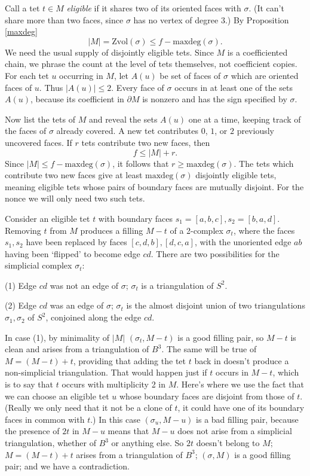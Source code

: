 \documentclass[12pt]{article}
\newcommand{\kw}{\mathrm}
\newcommand{\maxdeg}{\kw{maxdeg}}
\newcommand{\Zvol}{\kw{Zvol}}
\begin{document}
Call a tet $t \in M$ \emph{eligible} if it shares two of its oriented faces
with $\sigma$. (It can't share more than two faces,
since $\sigma$ has no vertex of
degree $3$.)
By Proposition \ref{maxdeg}
\[
|M| = \Zvol(\sigma) \leq f-\maxdeg(\sigma) .
\]
We need the usual supply of disjointly eligible tets.  Since $M$ is a
coefficiented chain, we phrase the count at the level of tets themselves,
not coefficient copies.  For each tet $u$ occurring in $M$, let $A(u)$ be
set of faces of $\sigma$ which are oriented faces of $u$.  Thus
$|A(u)|\leq 2$.  Every face of $\sigma$ occurs in at least one of the sets
$A(u)$, because its coefficient in $\partial M$ is nonzero and has the sign
specified by $\sigma$.

Now list the tets of $M$ and reveal the sets $A(u)$ one at a time, keeping
track of the faces of $\sigma$ already covered.  A new tet contributes
$0$, $1$, or $2$ previously uncovered faces.  If $r$ tets contribute two
new faces, then
\[
f \leq |M|+r.
\]
Since $|M|\leq f-\maxdeg(\sigma)$, it follows that
$r\geq \maxdeg(\sigma)$.  The tets which contribute two new faces give at
least $\maxdeg(\sigma)$ disjointly eligible tets, meaning eligible tets
whose pairs of boundary faces are mutually disjoint.  For the nonce we will
only need two such tets.

Consider an eligible tet $t$ with boundary faces
$s_1=[a,b,c],s_2=[b,a,d]$.
Removing $t$ from $M$ produces a filling $M-t$
of a 2-complex $\sigma_t$, where the faces $s_1,s_2$ have been replaced
by faces $[c,d,b],[d,c,a]$,
with the unoriented edge $ab$ having been `flipped' to become edge $cd$.
There are two possibilities for the simplicial complex $\sigma_t$:

(1) Edge $cd$ was not an edge of $\sigma$;
$\sigma_t$ is a triangulation of $S^2$.

(2) Edge $cd$ was an edge of $\sigma$;
$\sigma_t$ is the almost disjoint union of two triangulations
$\sigma_1,\sigma_2$ of $S^2$, conjoined along the edge $cd$.

In case (1), by minimality of $|M|$
$(\sigma_t,M-t)$ is a good filling pair,
so $M-t$ is clean and arises from a triangulation of $B^3$.
The same will be true of $M = (M-t) + t$,
providing that adding the tet $t$ back in
doesn't produce a non-simplicial triangulation.
That would happen just if $t$ occurs in $M-t$, which is to say that
$t$ occurs with multiplicity 2 in $M$.
Here's where we use the fact that we can choose an eligible tet $u$
whose boundary faces are disjoint from those of $t$.
(Really we only need that it not be a clone of $t$, it could have
one of its boundary faces in common with $t$.)
In this case $(\sigma_u, M-u)$ is a bad filling pair,
because the presence of $2t$ in $M-u$ means that $M-u$ does not
arise from a simplicial triangulation, whether of $B^3$ or anything else.
So $2t$ doesn't belong to $M$; $M=(M-t)+t$ arises from a triangulation of $B^3$;
$(\sigma,M)$ is a good filling pair; and we have a contradiction.
\end{document}
